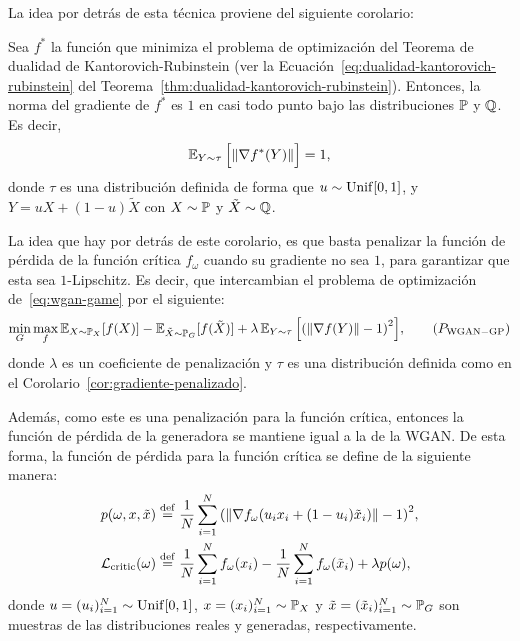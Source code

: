 La idea por detrás de esta técnica proviene del siguiente corolario:

\begin{corollary}\label{cor:gradiente-penalizado}
    Sea $f^\ast$ la función que minimiza el problema de optimización del Teorema de dualidad de Kantorovich-Rubinstein (ver la Ecuación~\eqref{eq:dualidad-kantorovich-rubinstein} del Teorema~\ref{thm:dualidad-kantorovich-rubinstein}). Entonces, la norma del gradiente de $f^\ast$ es $1$ en casi todo punto bajo las distribuciones $\Prob$ y $\ProbQ$. Es decir,
    \begin{equation}
        \Exp_{Y\sim\tau} \qty\Big[ \norm{\nabla f^\ast(Y)} ] = 1,
    \end{equation}
    donde $\tau$ es una distribución definida de forma que $u\sim\mathrm{Unif}[0, 1]$, y $Y = uX + (1-u)\tilde X$ con $X\sim\Prob$ y $\tilde X\sim\ProbQ$.
\end{corollary}

La idea que hay por detrás de este corolario, es que basta penalizar la función de pérdida de la función crítica $f_\omega$ cuando su gradiente no sea $1$, para garantizar que esta sea $1$-Lipschitz. Es decir, que intercambian el problema de optimización de~\eqref{eq:wgan-game} por el siguiente:
\begin{equation}

    \min_{G} \max_{f} \Exp_{X\sim \Prob_X} [f(X)] - \Exp_{\tilde X \sim \Prob_G} [f(\tilde X)] + \lambda \Exp_{Y\sim\tau} \qty\Big[ \qty(\norm{\nabla f(Y)} - 1)^2 ],\tag{$P_{\mathrm{WGAN-GP}}$}

\end{equation}
donde $\lambda$ es un coeficiente de penalización y $\tau$ es una distribución definida como en el Corolario~\ref{cor:gradiente-penalizado}.

Además, como este es una penalización para la función crítica, entonces la función de pérdida de la generadora se mantiene igual a la de la WGAN. De esta forma, la función de pérdida para la función crítica se define de la siguiente manera:
\begin{align}
    p(\omega, x, \tilde x) & \stackrel{\mathrm{def}}{=} \frac{1}{N} \sum_{i=1}^{N} \qty(
    \norm{\nabla f_\omega(u_i x_i + (1-u_i) \tilde x_i)} - 1
    )^2 ,
    \\ \mathcal{L}_{\mathrm{critic}}(\omega) & \stackrel{\mathrm{def}}{=}
    \frac{1}{N} \sum_{i=1}^{N} f_\omega(x_i) - \frac{1}{N} \sum_{i=1}^{N} f_\omega(\tilde x_i)
    + \lambda p(\omega),
\end{align}
donde $u = (u_i)_{i=1}^{N} \sim \mathrm{Unif}[0, 1]$, $x = (x_i)_{i=1}^{N} \sim \Prob_X$ y $\tilde x = (\tilde x_i)_{i=1}^{N} \sim \Prob_G$ son muestras de las distribuciones reales y generadas, respectivamente.


